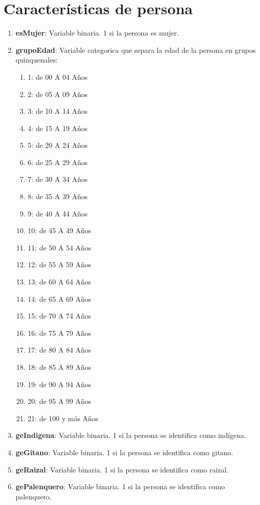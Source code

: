 \documentclass[12pt,a4paper]{article}
\begin{document}
\section{Características de persona}

\begin{enumerate}
	\item \textbf{esMujer}: Variable binaria. 1 si la persona es mujer.
	\item \textbf{grupoEdad}: Variable categorica que separa la edad de la persona en grupos quinquenales:
		\begin{enumerate}
			\item 1: de 00 A 04 Años
			\item 2: de 05 A 09 Años
			\item 3: de 10 A 14 Años
			\item 4: de 15 A 19 Años
			\item 5: de 20 A 24 Años
			\item 6: de 25 A 29 Años
			\item 7: de 30 A 34 Años
			\item 8: de 35 A 39 Años
			\item 9: de 40 A 44 Años
			\item 10: de 45 A 49 Años
			\item 11: de 50 A 54 Años
			\item 12: de 55 A 59 Años
			\item 13: de 60 A 64 Años
			\item 14: de 65 A 69 Años
			\item 15: de 70 A 74 Años
			\item 16: de 75 A 79 Años
			\item 17: de 80 A 84 Años
			\item 18: de 85 A 89 Años
			\item 19: de 90 A 94 Años
			\item 20: de 95 A 99 Años
			\item 21: de 100 y más Años
		\end{enumerate}
	\item \textbf{geIndigena}: Variable binaria. 1 si la persona se identifica como indígena.
	\item \textbf{geGitano}: Variable binaria. 1 si la persona se identifica como gitano.
	\item \textbf{geRaizal}: Variable binaria. 1 si la persona se identifica como raizal.
	\item \textbf{gePalenquero}: Variable binaria. 1 si la persona se identifica como palenquero.

\end{enumerate}
\end{document}
